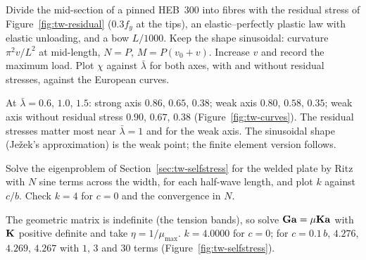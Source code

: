 \label{exo:tw-computer-fibre}
%
Divide the mid-section of a pinned HEB~300 into fibres with the residual stress of Figure~\ref{fig:tw-residual}
($0.3f_y$ at the tips), an elastic--perfectly plastic law with elastic unloading, and a bow $L/1000$. Keep the
shape sinusoidal: curvature $\pi^2v/L^2$ at mid-length, $N = P$, $M = P(v_0 + v)$. Increase $v$ and record the
maximum load. Plot $\chi$ against $\bar\lambda$ for both axes, with and without residual stresses, against the European
curves.
\begin{solution}
At $\bar\lambda = 0.6$, $1.0$, $1.5$: strong axis $0.86$, $0.65$, $0.38$; weak axis $0.80$, $0.58$, $0.35$; weak axis
without residual stress $0.90$, $0.67$, $0.38$ (Figure~\ref{fig:tw-curves}). The residual stresses matter most
near $\bar\lambda = 1$ and for the weak axis. The sinusoidal shape (Je\v{z}ek's approximation) is the weak point; the
finite element version follows.

\end{solution}

\label{exo:tw-computer-selfstress}
%
Solve the eigenproblem of Section~\ref{sec:tw-selfstress} for the welded plate by Ritz with $N$ sine terms
across the width, for each half-wave length, and plot $k$ against $c/b$. Check $k = 4$ for $c = 0$ and the
convergence in $N$.
\begin{solution}
The geometric matrix is indefinite (the tension bands), so solve $\mathbf{G}\mathbf{a} = \mu\mathbf{K}\mathbf{a}$ with $\mathbf{K}$ positive
definite and take $\eta = 1/\mu_{\max}$. $k = 4.0000$ for $c = 0$; for $c = 0.1\,b$, $4.276$, $4.269$, $4.267$ with $1$, $3$
and $30$ terms (Figure~\ref{fig:tw-selfstress}).

\end{solution}

